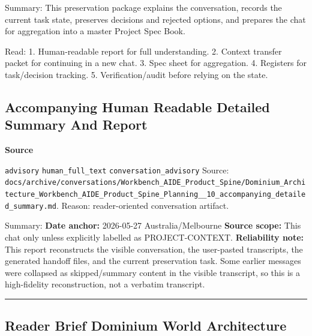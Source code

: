 \documentclass[9pt,a4paper,openany]{book}
\newcommand{\vonecallout}[3]{\par\medskip\noindent\begingroup\setlength{\fboxsep}{7pt}\colorbox{DomCalloutBg}{\parbox{0.94\linewidth}{\textbf{\textcolor{#1}{#2}}\par #3}}\endgroup\par\medskip}
\begin{document}
Summary: This preservation package explains the conversation, records the current task state, preserves decisions and rejected options, and prepares the chat for aggregation into a master Project Spec Book.\allowbreak{}


Read: 1.\allowbreak{} Human-\allowbreak{}readable report for full understanding.\allowbreak{} 2.\allowbreak{} Context transfer packet for continuing in a new chat.\allowbreak{} 3.\allowbreak{} Spec sheet for aggregation.\allowbreak{} 4.\allowbreak{} Registers for task/\allowbreak{}decision tracking.\allowbreak{} 5.\allowbreak{} Verification/\allowbreak{}audit before relying on the state.\allowbreak{}



\subsection{Accompanying Human Readable Detailed Summary And Report}

\vonecallout{DomSlate}{Source}{\texttt{advisory} \texttt{human\_\allowbreak{}full\_\allowbreak{}text} \texttt{conversation\_\allowbreak{}advisory} Source: \texttt{docs/\allowbreak{}archive/\allowbreak{}conversations/\allowbreak{}Workbench\_\allowbreak{}AIDE\_\allowbreak{}Product\_\allowbreak{}Spine/\allowbreak{}Dominium\_\allowbreak{}Architecture\_\allowbreak{}Workbench\_\allowbreak{}AIDE\_\allowbreak{}Product\_\allowbreak{}Spine\_\allowbreak{}Planning\_\allowbreak{}\_\allowbreak{}10\_\allowbreak{}accompanying\_\allowbreak{}detailed\_\allowbreak{}summary.\allowbreak{}md}.\allowbreak{} Reason: reader-\allowbreak{}oriented conversation artifact.\allowbreak{}}

Summary: \textbf{Date anchor:} 2026-\allowbreak{}05-\allowbreak{}27 Australia/\allowbreak{}Melbourne \textbf{Source scope:} This chat only unless explicitly labelled as PROJECT-\allowbreak{}CONTEXT.\allowbreak{} \textbf{Reliability note:} This report reconstructs the visible conversation, the user-\allowbreak{}pasted transcripts, the generated handoff files, and the current preservation task.\allowbreak{} Some earlier messages were collapsed as skipped/\allowbreak{}summary content in the visible transcript, so this is a high-\allowbreak{}fidelity reconstruction, not a verbatim transcript.\allowbreak{}


\par\medskip\hrule\medskip


\subsection{Reader Brief Dominium World Architecture}
\end{document}
